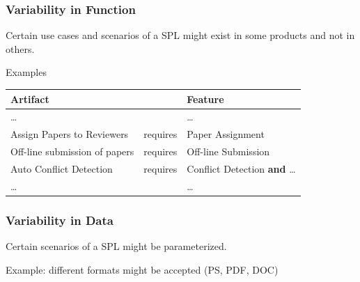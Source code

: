 \documentclass[xcolor=svgnames]{beamer}
\begin{document}
\begin{frame}
\frametitle{Variability in Function}
Certain use cases and scenarios of a SPL might exist in some
products and not in others.

\begin{block}{Examples}
\begin{scriptsize}
\begin{center}
\begin{tabular}{|p{1.6in}p{0.4in}p{1.6in}|}
\hline 
Artifact &  & Feature \\ \hline
\ldots & & \ldots \\ \hline
Assign Papers to Reviewers & requires & Paper Assignment \\ \hline
Off-line submission of papers & requires & Off-line Submission \\ \hline
Auto Conflict Detection & requires & Conflict Detection {\bf and} \ldots \\
\hline

\ldots & & \ldots \\
\hline
\end{tabular}
\end{center}
\end{scriptsize}
\end{block}

\end{frame}

\begin{frame}
\frametitle{Variability in Data}
Certain scenarios of a SPL might be parameterized.

\begin{block}{Example: different formats might be accepted (PS, PDF, DOC)}

\begin{center} 

\end{center}
\end{block}
\end{frame}
\end{document}
